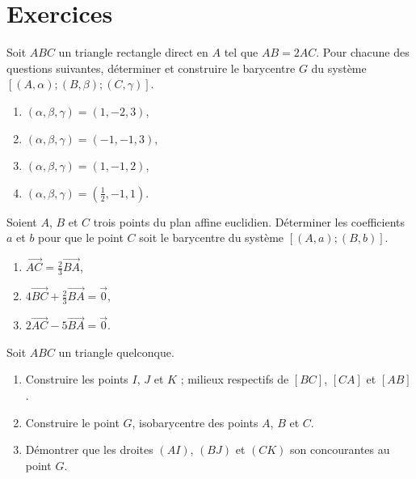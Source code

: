 \section{Exercices}
\begin{exo}\label{exo:bary-1}
      Soit $ABC$ un triangle rectangle direct en $A$ tel que $AB = 2AC$. 
      Pour chacune des questions suivantes, d\'eterminer et construire le barycentre $G$ du syst\`eme $[(A,\alpha) ; (B,\beta) ; (C,\gamma) ]$.
      \begin{enumerate}
            \item $(\alpha , \beta , \gamma) = (1,-2,3)$,
            \item $(\alpha , \beta , \gamma) = (-1,-1,3)$,
            \item $(\alpha , \beta , \gamma) = (1,-1,2)$,
            \item $(\alpha , \beta , \gamma) = (\frac{1}{2},-1,1)$.
      \end{enumerate}
\end{exo}
%
\begin{exo}\label{exo:bary-2}
      Soient $A$, $B$ et $C$ trois points du plan affine euclidien.
      D\'eterminer les coefficients $a$ et $b$ pour que le point $C$ soit le barycentre du syst\`eme $[(A,a);(B,b)]$.
      \begin{enumerate}
            \item $\overrightarrow{AC} = \frac{2}{3} \overrightarrow{BA}$,
            \item $4\overrightarrow{BC} + \frac{2}{3} \overrightarrow{BA} = \overrightarrow{0}$,
            \item $2 \overrightarrow{AC} - 5 \overrightarrow{BA} = \overrightarrow{0}$.
      \end{enumerate}
\end{exo}
%
\begin{exo}\label{exo:bary-3}
      Soit $ABC$ un triangle quelconque.
      \begin{enumerate}
            \item Construire les points $I$, $J$ et $K$ ; milieux respectifs de $[BC]$, $[CA]$ et $[AB]$.
            \item Construire le point $G$, isobarycentre des points $A$, $B$ et $C$.
            \item D\'emontrer que les droites $(AI)$, $(BJ)$ et $(CK)$ son concourantes au point $G$.
      \end{enumerate}
\end{exo}
%
